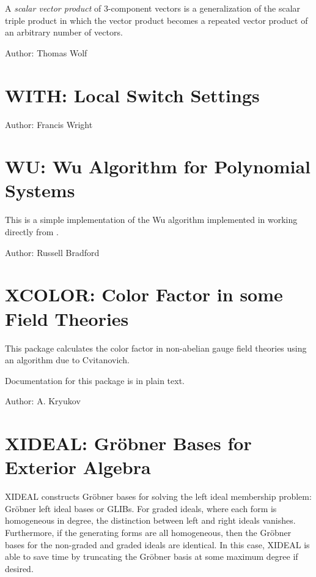 A \emph{scalar vector product} of 3-component vectors is a
generalization of the scalar triple product in which the vector
product becomes a repeated vector product of an arbitrary number of
vectors.

Author: Thomas Wolf



\newpage

\section{WITH: Local Switch Settings}
\hypertarget{operator:WITH}{}

Author: Francis Wright



\newpage

\section{WU: Wu Algorithm for Polynomial Systems}

This is a simple implementation of the Wu algorithm implemented in \REDUCE
working directly from \cite{Wu:1987a}.

Author: Russell Bradford



\newpage

\section{XCOLOR: Color Factor in some Field Theories}


This package calculates the color factor in non-abelian gauge field
theories using an algorithm due to Cvitanovich.

Documentation for this package is in plain text.

Author: A. Kryukov



\newpage

\section{XIDEAL: Gr\"obner Bases for Exterior Algebra}
\label{package:XIDEAL}

XIDEAL constructs Gr\"obner bases for solving the left ideal membership
problem: Gr\"obner left ideal bases or GLIBs. For graded ideals, where each
form is homogeneous in degree, the distinction between left and right
ideals vanishes. Furthermore, if the generating forms are all homogeneous,
then the Gr\"obner bases for the non-graded and graded ideals are
identical. In this case, XIDEAL is able to save time by truncating the
Gr\"obner basis at some maximum degree if desired.

